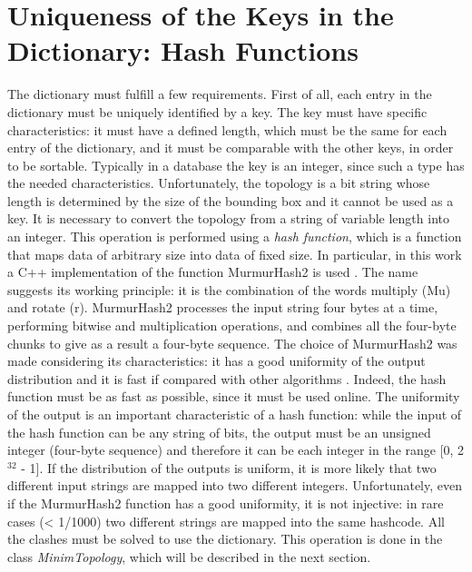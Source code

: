 \section{Uniqueness of the Keys in the Dictionary: Hash Functions}
The dictionary must fulfill a few requirements. First of all, each entry in the dictionary must be uniquely identified by a key. The key must have specific characteristics: it must have a defined length, which must be the same for each entry of the dictionary, and it must be comparable with the other keys, in order to be sortable. Typically in a database the key is an integer, since such a type has the needed characteristics. Unfortunately, the topology is a bit string whose length is determined by the size of the bounding box and it cannot be used as a key. It is necessary to convert the topology from a string of variable length into an integer. This operation is performed using a \textit{hash function}, which is a function that maps data of arbitrary size into data of fixed size. In particular, in this work a C++ implementation of the function MurmurHash2 is used . The name suggests its working principle: it is the combination of the words multiply (Mu) and rotate (r). MurmurHash2 processes the input string four bytes at a time, performing bitwise and multiplication operations, and combines all the four-byte chunks to give as a result a four-byte sequence. The choice of MurmurHash2 was made considering its characteristics: it has a good uniformity of the output distribution and it is fast if compared with other algorithms \cite{hash}. Indeed, the hash function must be as fast as possible, since it must be used online. The uniformity of the output is an important characteristic of a hash function: while the input of the hash function can be any string of bits, the output must be an unsigned integer (four-byte sequence) and therefore it can be each integer in the range [0, 2$^{32}$ - 1]. If the distribution of the outputs is uniform, it is more likely that two different input strings are mapped into two different integers. Unfortunately, even if the MurmurHash2 function has a good uniformity, it is not injective: in rare cases (< 1/1000) two different strings are mapped into the same hashcode. All the clashes must be solved to use the dictionary. This operation is done in the class \textit{MinimTopology}, which will be described in the next section.
%
